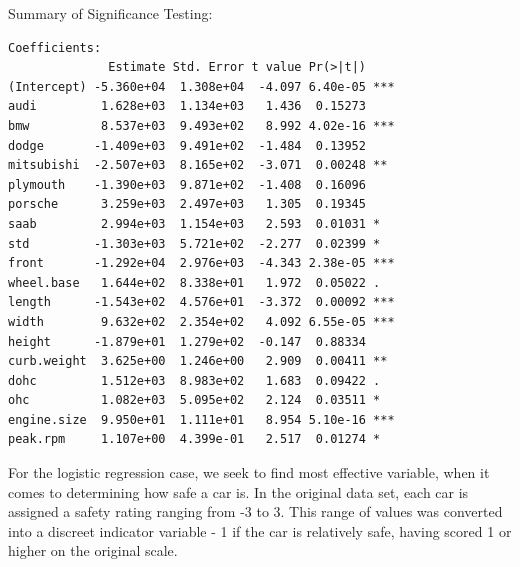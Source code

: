 \documentclass[letter]{article}
\begin{document}
Summary of Significance Testing:\\
\begin{verbatim}
Coefficients:
              Estimate Std. Error t value Pr(>|t|)    
(Intercept) -5.360e+04  1.308e+04  -4.097 6.40e-05 ***
audi         1.628e+03  1.134e+03   1.436  0.15273    
bmw          8.537e+03  9.493e+02   8.992 4.02e-16 ***
dodge       -1.409e+03  9.491e+02  -1.484  0.13952    
mitsubishi  -2.507e+03  8.165e+02  -3.071  0.00248 ** 
plymouth    -1.390e+03  9.871e+02  -1.408  0.16096    
porsche      3.259e+03  2.497e+03   1.305  0.19345    
saab         2.994e+03  1.154e+03   2.593  0.01031 *  
std         -1.303e+03  5.721e+02  -2.277  0.02399 *  
front       -1.292e+04  2.976e+03  -4.343 2.38e-05 ***
wheel.base   1.644e+02  8.338e+01   1.972  0.05022 .  
length      -1.543e+02  4.576e+01  -3.372  0.00092 ***
width        9.632e+02  2.354e+02   4.092 6.55e-05 ***
height      -1.879e+01  1.279e+02  -0.147  0.88334    
curb.weight  3.625e+00  1.246e+00   2.909  0.00411 ** 
dohc         1.512e+03  8.983e+02   1.683  0.09422 .  
ohc          1.082e+03  5.095e+02   2.124  0.03511 *  
engine.size  9.950e+01  1.111e+01   8.954 5.10e-16 ***
peak.rpm     1.107e+00  4.399e-01   2.517  0.01274 *  
\end{verbatim}

\newpage


For the logistic regression case, we seek to find most effective variable, when it comes to determining how safe a car is.  In the original data set, each car is assigned a safety rating ranging from -3 to 3.  This range of values was converted into a discreet indicator variable - 1 if the car is relatively safe, having scored 1 or higher on the original scale.

\end{document}

